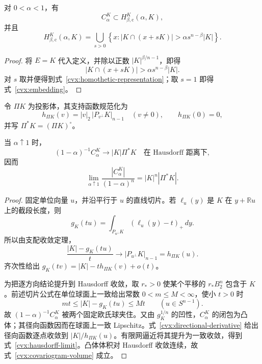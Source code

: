 \begin{proposition}[卷积体嵌入与精确同似表示]
\label{cvx:convolution-embedding}
对 $0<\alpha<1$，有
\begin{equation}
 C^K_\alpha\subset H^K_{\beta,\mathrm c}(\alpha,K),
 \label{cvx:embedding}
\end{equation}
并且
\begin{equation}
 H^K_{\beta,\mathrm c}(\alpha,K)
 =\bigcup_{s>0}\left\{x:|K\cap(x+sK)|>\alpha s^{n-\beta}|K|\right\}.
 \label{cvx:homothetic-representation}
\end{equation}
\end{proposition}

\begin{proof}
将 $E=K$ 代入定义，并除以正数 $|K|^{\beta/n-1}$，即得
\[
 |K\cap(x+sK)|>\alpha s^{n-\beta}|K|.
\]
对 $s$ 取并便得到式~\eqref{cvx:homothetic-representation}；取 $s=1$ 即得
式~\eqref{cvx:embedding}。
\end{proof}

令 $\Pi K$ 为投影体，其支持函数规范化为
\[
 h_{\Pi K}(v)=|v|_2\,\bigl|P_{v^\perp}K\bigr|_{n-1}\quad(v\ne0),
 \qquad h_{\Pi K}(0)=0,
\]
并写 $\Pi^*K=(\Pi K)^\circ$。

\begin{lemma}[卷积体的近端极限]
\label{cvx:covariogram-limit}
当 $\alpha\uparrow1$ 时，
\begin{equation}
 (1-\alpha)^{-1}C^K_\alpha\longrightarrow |K|\Pi^*K
 \quad\text{在 Hausdorff 距离下},
 \label{cvx:hausdorff-limit}
\end{equation}
因而
\begin{equation}
 \lim_{\alpha\uparrow1}\frac{|C^K_\alpha|}{(1-\alpha)^n}
 =|K|^n|\Pi^*K|.
 \label{cvx:covariogram-volume}
\end{equation}
\end{lemma}

\begin{proof}
固定单位向量 $u$，并沿平行于 $u$ 的直线切片。若 $\ell_u(y)$ 是
$K$ 在 $y+\mathbb Ru$ 上的截段长度，则
\[
 g_K(tu)=\int_{P_{u^\perp}K}(\ell_u(y)-t)_+\,dy.
\]
所以由支配收敛定理，
\begin{equation}
 \frac{|K|-g_K(tu)}t\longrightarrow |P_{u^\perp}K|_{n-1}=h_{\Pi K}(u).
 \label{cvx:directional-derivative}
\end{equation}
齐次性给出 $g_K(tv)=|K|-t h_{\Pi K}(v)+o(t)$。

为把逐方向结论提升到 Hausdorff 收敛，取 $r_*>0$ 使某个平移的 $r_*B_2^n$ 包含于
$K$。前述切片公式在单位球面上一致给出常数 $0<m\le M<\infty$，使小 $t>0$ 时
\[
 mt\le |K|-g_K(tu)\le Mt\qquad(u\in S^{n-1}).
\]
故 $(1-\alpha)^{-1}C^K_\alpha$ 被两个固定欧氏球夹住。又由
$g_K^{1/n}$ 的凹性，$C^K_\alpha$ 的闭包为凸体；其径向函数因而在球面上一致
Lipschitz。式~\eqref{cvx:directional-derivative} 给出径向函数逐点收敛到
$|K|/h_{\Pi K}(u)$。有限网逼近将其提升为一致收敛，得到
式~\eqref{cvx:hausdorff-limit}。凸体体积对 Hausdorff 收敛连续，故
式~\eqref{cvx:covariogram-volume} 成立。
\end{proof}

